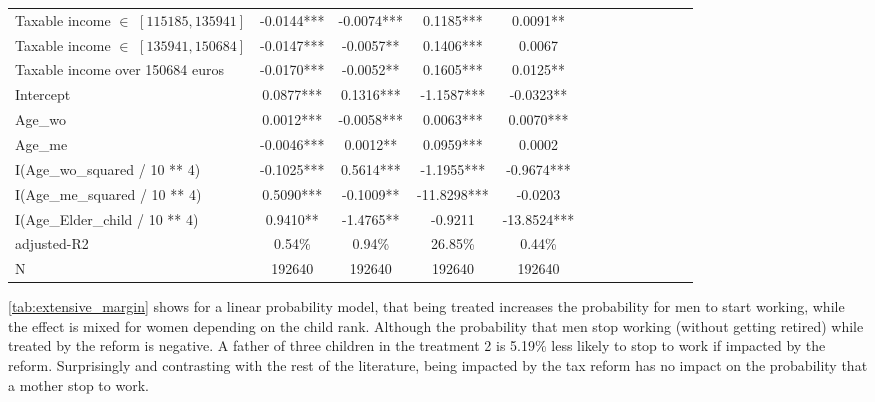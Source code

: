 \begin{table}[H]
{\begin{tabular}{lcccccccccccc}
Taxable income $\in$ $[115185,135941]$            & -0.0144***              &     -0.0074***             &   0.1185***                    &  0.0091**                    \\
Taxable income $\in$ $[135941,150684]$            & -0.0147***              &     -0.0057**              &   0.1406***                    &  0.0067                      \\
Taxable income over 150684 euros                  & -0.0170***              &     -0.0052**              &   0.1605***                    &  0.0125**                    \\
\midrule
Intercept                                         & 0.0877***               &     0.1316***              &   -1.1587***                   &  -0.0323**                   \\
\midrule
Age_wo                                            & 0.0012***               &     -0.0058***             &   0.0063***                    &  0.0070***                   \\
Age_me                                            & -0.0046***              &     0.0012**               &   0.0959***                    &  0.0002                      \\
I(Age_wo_squared / 10 ** 4)                       & -0.1025***              &     0.5614***              &   -1.1955***                   &  -0.9674***                  \\
I(Age_me_squared / 10 ** 4)                       & 0.5090***               &     -0.1009**              &   -11.8298***                  &  -0.0203                     \\
I(Age_Elder_child / 10 ** 4)                      & 0.9410**                &     -1.4765**              &   -0.9211                      &  -13.8524***                 \\
adjusted-R2                                       & 0.54\%                  &     0.94\%                 &   26.85\%                     &  0.44\%                        \\
N                                                 & 192640                  &     192640                 &   192640                       &  192640                      \\
\bottomrule
\end{tabular}
}
\end{table} 




\autoref{tab:extensive_margin} shows for a linear probability model, that being treated increases the probability for men to start working, while the effect is mixed for women depending on the child rank. 
Although the probability that men stop working (without getting retired) while treated by the reform is negative. A father of three children in the treatment 2 is 5.19\% less likely to stop to work if impacted by the reform. Surprisingly and contrasting with the rest of the literature, being impacted by the tax reform has no impact on the probability that a mother stop to work. 


